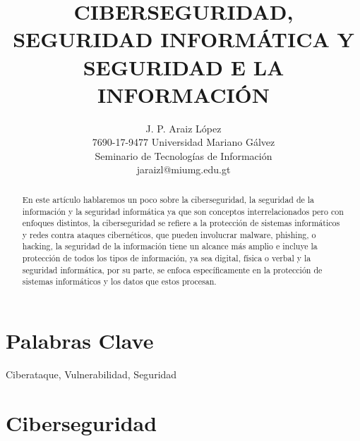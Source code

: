 \documentclass[12pt]{article}
\title{CIBERSEGURIDAD, SEGURIDAD INFORMÁTICA Y SEGURIDAD E LA INFORMACIÓN}
\author{J. P. Araiz López\\
  \small 7690-17-9477 Universidad Mariano Gálvez\\
  \small Seminario de Tecnologías de Información\\
  \small jaraizl@miumg.edu.gt
}
\begin{document}
\maketitle

\begin{abstract}
En este artículo hablaremos un poco sobre la ciberseguridad, la seguridad de la información y la seguridad informática ya que son conceptos interrelacionados pero con enfoques distintos, la ciberseguridad se refiere a la protección de sistemas informáticos y redes contra ataques cibernéticos, que pueden involucrar malware, phishing, o hacking, la seguridad de la información tiene un alcance más amplio e incluye la protección de todos los tipos de información, ya sea digital, física o verbal y la seguridad informática, por su parte, se enfoca específicamente en la protección de sistemas informáticos y los datos que estos procesan. 

\end{abstract}
\maketitle{}


\section*{Palabras Clave}
Ciberataque, Vulnerabilidad, Seguridad

\section*{Ciberseguridad}
\end{document}
